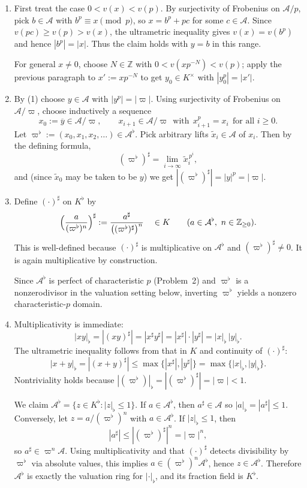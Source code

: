 \documentclass[12pt]{article}  %
\begin{document}
\begin{solution}
\begin{enumerate}
    \item First treat the case $0<v(x)<v(p)$. By surjectivity of Frobenius on $\mathcal A/p$, pick $b\in\mathcal A$ with
$b^p\equiv x \pmod p$, so $x=b^p+pc$ for some $c\in\mathcal A$. Since $v(pc)\ge v(p)>v(x)$, the ultrametric inequality gives
$v(x)=v(b^p)$ and hence $|b^p|=|x|$. Thus the claim holds with $y=b$ in this range.

For general $x\ne0$, choose $N\in\mathbb Z$ with $0<v(xp^{-N})<v(p)$; apply the previous paragraph to $x':=xp^{-N}$ to get $y_0\in K^\times$ with $|y_0^p|=|x'|$. 

\item 
By (1) choose $y\in\mathcal A$ with $|y^p|=|\varpi|$. Using surjectivity of Frobenius on $\mathcal A/\varpi$, choose inductively a sequence
\[
x_0:=\overline{y}\in \mathcal A/\varpi,\qquad
x_{i+1}\in \mathcal A/\varpi\ \ \text{with}\ \ x_{i+1}^p=x_i\ \ \text{for all }i\ge0.
\]
Let $\varpi^\flat:=(x_0,x_1,x_2,\ldots)\in\mathcal A^\flat$. Pick arbitrary lifts $\tilde x_i\in\mathcal A$ of $x_i$. Then by the defining formula,
\[
(\varpi^\flat)^\sharp=\lim_{i\to\infty} \tilde x_i^{\,p^i},
\]
and (since $\tilde x_0$ may be taken to be $y$) we get $|(\varpi^\flat)^\sharp|=|y|^p=|\varpi|$.

\item 
Define $(\cdot)^\sharp$ on $K^\flat$ by
\[
\Bigl(\frac{a}{(\varpi^\flat)^n}\Bigr)^\sharp:=\frac{a^\sharp}{\bigl((\varpi^\flat)^\sharp\bigr)^n}
\quad\in K
\qquad (a\in\mathcal A^\flat,\ n\in\mathbb Z_{\ge0}).
\]
This is well-defined because $(\cdot)^\sharp$ is multiplicative on $\mathcal A^\flat$ and $(\varpi^\flat)^\sharp\neq0$. It is again multiplicative by construction. 

Since $\mathcal A^\flat$ is perfect of characteristic $p$ (Problem~2) and $\varpi^\flat$ is a nonzerodivisor in the valuation setting below, inverting $\varpi^\flat$ yields a nonzero characteristic-$p$ domain.

\item
Multiplicativity is immediate:
\[
|xy|_\flat = |(xy)^\sharp| = |x^\sharp y^\sharp| = |x^\sharp|\cdot|y^\sharp| = |x|_\flat\,|y|_\flat.
\]
The ultrametric inequality follows from that in $K$ and continuity of $(\cdot)^\sharp$:
\[
|x+y|_\flat = |(x+y)^\sharp| \le \max\{|x^\sharp|,|y^\sharp|\}
= \max\{|x|_\flat,|y|_\flat\}.
\]
Nontriviality holds because $|(\varpi^\flat)|_\flat=|(\varpi^\flat)^\sharp|=|\varpi|<1$.

We claim $\mathcal A^\flat=\{z\in K^\flat: |z|_\flat\le 1\}$. If $a\in\mathcal A^\flat$, then $a^\sharp\in\mathcal A$ so $|a|_\flat=|a^\sharp|\le 1$. Conversely, let $z=a/(\varpi^\flat)^n$ with $a\in\mathcal A^\flat$. If $|z|_\flat\le 1$, then
\[
|a^\sharp|\le |(\varpi^\flat)^\sharp|^n = |\varpi|^n,
\]
so $a^\sharp\in \varpi^n\mathcal A$. Using multiplicativity and that $(\cdot)^\sharp$ detects divisibility by $\varpi^\flat$ via absolute values, this implies $a\in (\varpi^\flat)^n\mathcal A^\flat$, hence $z\in\mathcal A^\flat$. Therefore $\mathcal A^\flat$ is exactly the valuation ring for $|\cdot|_\flat$, and its fraction field is $K^\flat$.
\end{enumerate}
\end{solution}
\end{document}
